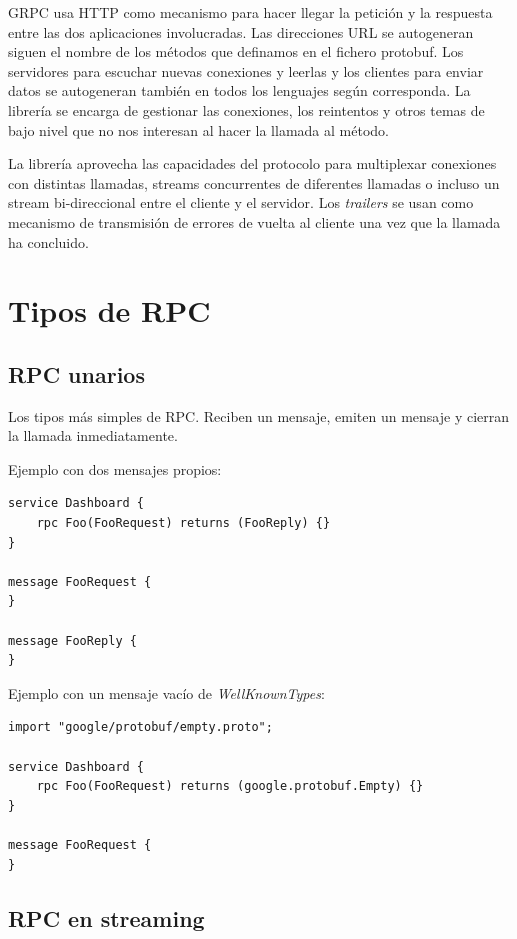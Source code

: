 GRPC usa HTTP como mecanismo para hacer llegar la petición y la respuesta entre las dos aplicaciones involucradas. Las direcciones URL se autogeneran siguen el nombre de los métodos que definamos en el fichero protobuf. Los servidores para escuchar nuevas conexiones y leerlas y los clientes para enviar datos se autogeneran también en todos los lenguajes según corresponda. La librería se encarga de gestionar las conexiones, los reintentos y otros temas de bajo nivel que no nos interesan al hacer la llamada al método.

La librería aprovecha las capacidades del protocolo para multiplexar conexiones con distintas llamadas, streams concurrentes de diferentes llamadas o incluso un stream bi-direccional entre el cliente y el servidor. Los \emph{trailers} se usan como mecanismo de transmisión de errores de vuelta al cliente una vez que la llamada ha concluido.

\section{Tipos de RPC}
\label{sec:rpc-types}

\subsection{RPC unarios}
\label{subsec:unary-rpc}

Los tipos más simples de RPC. Reciben un mensaje, emiten un mensaje y cierran la llamada inmediatamente.

Ejemplo con dos mensajes propios:
\begin{verbatim}
service Dashboard {
    rpc Foo(FooRequest) returns (FooReply) {}
}

message FooRequest {
}

message FooReply {
}
\end{verbatim}

Ejemplo con un mensaje vacío de \emph{WellKnownTypes}:
\begin{verbatim}
import "google/protobuf/empty.proto";

service Dashboard {
    rpc Foo(FooRequest) returns (google.protobuf.Empty) {}
}

message FooRequest {
}
\end{verbatim}

\subsection{RPC en streaming}
\label{subsec:streaming-rpc}


